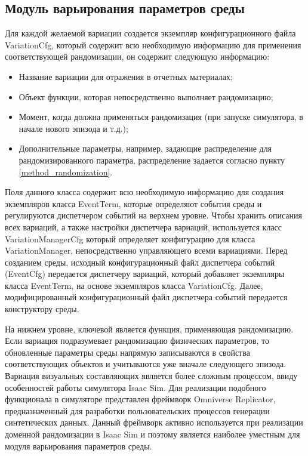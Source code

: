         \subsection{Модуль варьирования параметров среды}
            Для каждой желаемой вариации создается экземпляр конфигурационного файла VariationCfg, который содержит всю необходимую информацию для применения соответствующей рандомизации, он содержит следующую информацию:

            \begin{itemize}
                \item Название вариации для отражения в отчетных материалах;
                \item Объект функции, которая непосредственно выполняет рандомизацию;
                \item Момент, когда должна применяться рандомизация (при запуске симулятора, в начале нового эпизода и т.д.);
                \item Дополнительные параметры, например, задающие распределение для рандомизированного параметра, распределение задается согласно пункту \ref{method_randomization}.
            \end{itemize} 

            Поля данного класса содержит всю необходимую информацию для создания экземпляров класса EventTerm, которые определяют события среды и регулируются диспетчером событий на верхнем уровне.  
            Чтобы хранить описания всех вариаций, а также настройки диспетчера вариаций, используется класс VariationManagerCfg который определяет конфигурацию для класса VariationManager, непосредственно управляющего всеми вариациями. Перед созданием среды, исходный конфигурационный файл диспетчера событий (EventCfg) передается диспетчеру вариаций, который добавляет экземпляры класса EventTerm, на основе экземпляров класса VariationCfg. Далее, модифицированный конфигурационный файл диспетчера событий передается конструктору среды.

            На нижнем уровне, ключевой является функция, применяющая рандомизацию. Если вариация подразумевает рандомизацию физических параметров, то обновленные параметры среды напрямую записываются в свойства соответствующих объектов и учитываются уже вначале следующего эпизода. Вариация визуальных составляющих является более сложным процессом, ввиду особенностей работы симулятора Isaac Sim. Для реализации подобного функционала в симуляторе представлен фреймворк Omniverse Replicator, предназначенный для разработки пользовательских процессов генерации синтетических данных. Данный фреймворк активно используется при реализации доменной рандомизации в Isaac Sim и поэтому является наиболее уместным для модуля варьирования параметров среды. 
            
